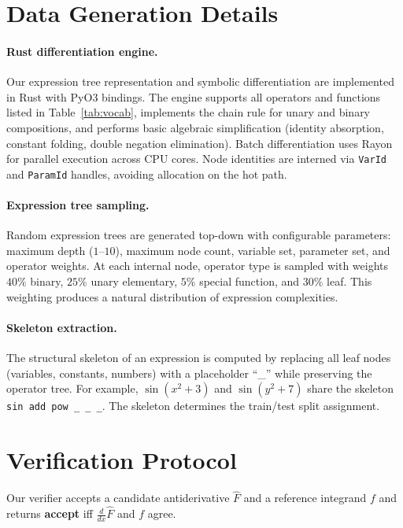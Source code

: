 \documentclass{article}
\begin{document}
\section{Data Generation Details}
\label{app:datagen}

\paragraph{Rust differentiation engine.}
Our expression tree representation and symbolic differentiation are
implemented in Rust with PyO$3$ bindings. The engine supports all operators
and functions listed in Table~\ref{tab:vocab}, implements the chain rule
for unary and binary compositions, and performs basic algebraic
simplification (identity absorption, constant folding, double negation
elimination). Batch differentiation uses Rayon for parallel execution
across CPU cores. Node identities are interned via \texttt{VarId} and
\texttt{ParamId} handles, avoiding allocation on the hot path.

\paragraph{Expression tree sampling.}
Random expression trees are generated top-down with configurable
parameters: maximum depth ($1$--$10$), maximum node count, variable set,
parameter set, and operator weights. At each internal node, operator type
is sampled with weights $40\%$ binary, $25\%$ unary elementary,
$5\%$ special function, and $30\%$ leaf. This weighting produces a natural
distribution of expression complexities.

\paragraph{Skeleton extraction.}
The structural skeleton of an expression is computed by replacing all leaf
nodes (variables, constants, numbers) with a placeholder ``\_'' while
preserving the operator tree. For example, $\sin(x^2 + 3)$ and
$\sin(y^2 + 7)$ share the skeleton
\texttt{sin add pow \_ \_ \_}. The skeleton determines the train/test
split assignment.


\section{Verification Protocol}
\label{app:verification}

Our verifier accepts a candidate antiderivative $\hat{F}$ and a reference
integrand $f$ and returns \textbf{accept} iff
$\tfrac{d}{dx}\hat{F}$ and $f$ agree.
\end{document}
